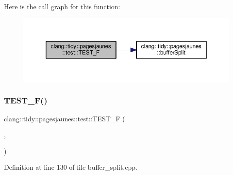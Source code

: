 Here is the call graph for this function\+:
\nopagebreak
\begin{figure}[H]
\begin{center}
\leavevmode
\includegraphics[width=350pt]{namespaceclang_1_1tidy_1_1pagesjaunes_1_1test_ae780e29f506c788f65df42a334447da4_cgraph}
\end{center}
\end{figure}
\mbox{\label{namespaceclang_1_1tidy_1_1pagesjaunes_1_1test_adb93e03e4a6b2fa98585f02022bf570f}} 
\subsubsection{\texorpdfstring{T\+E\+S\+T\+\_\+\+F()}{TEST\_F()}\hspace{0.1cm}{\footnotesize\ttfamily [31/57]}}
{\footnotesize\ttfamily clang\+::tidy\+::pagesjaunes\+::test\+::\+T\+E\+S\+T\+\_\+F (\begin{DoxyParamCaption}\item[{\hyperlink{classclang_1_1tidy_1_1pagesjaunes_1_1test_1_1_buffer_split_test}{Buffer\+Split\+Test}}]{,  }\item[{One\+Empty\+Line\+Buffer\+Start\+At1}]{ }\end{DoxyParamCaption})}



Definition at line 130 of file buffer\+\_\+split.\+cpp.

